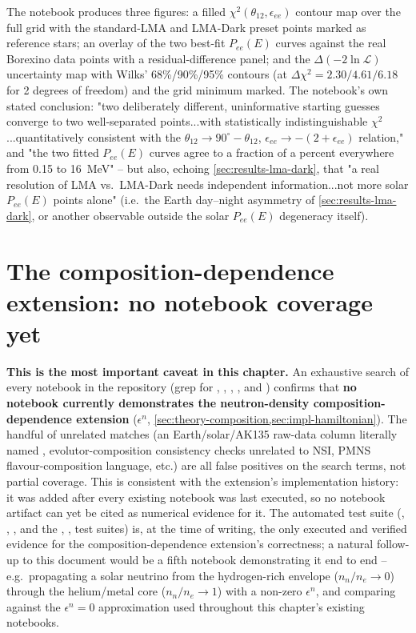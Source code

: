 The notebook produces three figures: a filled $\chi^2(\theta_{12},\epsilon_{ee})$
contour map over the full grid with the standard-LMA and LMA-Dark preset
points marked as reference stars; an overlay of the two best-fit $P_{ee}(E)$
curves against the real Borexino data points with a residual-difference
panel; and the $\Delta(-2\ln\mathcal L)$ uncertainty map with Wilks'
68\%/90\%/95\% contours (at $\Delta\chi^2=2.30/4.61/6.18$ for 2 degrees of
freedom) and the grid minimum marked. The notebook's own stated conclusion:
"two deliberately different, uninformative starting guesses converge to two
well-separated points...with statistically indistinguishable
$\chi^2$...quantitatively consistent with the
$\theta_{12}\to90^\circ-\theta_{12}$,
$\epsilon_{ee}\to-(2+\epsilon_{ee})$ relation," and "the two fitted
$P_{ee}(E)$ curves agree to a fraction of a percent everywhere from 0.15 to
16~MeV" -- but also, echoing \cref{sec:results-lma-dark}, that "a real
resolution of LMA vs.\ LMA-Dark needs independent information...not more
solar $P_{ee}(E)$ points alone" (i.e.\ the Earth day--night asymmetry of
\cref{sec:results-lma-dark}, or another observable outside the solar
$P_{ee}(E)$ degeneracy itself).

\section{The composition-dependence extension: no notebook coverage yet}

\begin{notebox}
\textbf{This is the most important caveat in this chapter.} An exhaustive
search of every notebook in the repository (grep for ,
, , , and
) confirms that \textbf{no notebook currently
demonstrates the neutron-density composition-dependence extension}
($\epsilon^n$, \cref{sec:theory-composition,sec:impl-hamiltonian}). The
handful of unrelated matches (an Earth/solar/AK135 raw-data column literally
named , evolutor-composition consistency
checks unrelated to NSI, PMNS flavour-composition language, etc.) are all
false positives on the search terms, not partial coverage. This is
consistent with the extension's implementation history: it was added after
every existing notebook was last executed, so no notebook artifact can yet
be cited as numerical evidence for it. The automated test suite
(,
,
, and the
, , 
test suites) is, at the time of writing, the only executed and verified
evidence for the composition-dependence extension's correctness; a natural
follow-up to this document would be a fifth notebook demonstrating it end
to end -- e.g.\ propagating a solar neutrino from the hydrogen-rich envelope
($n_n/n_e\to0$) through the helium/metal core ($n_n/n_e\to1$) with a
non-zero $\epsilon^n$, and comparing against the $\epsilon^n=0$
approximation used throughout this chapter's existing notebooks.
\end{notebox}
